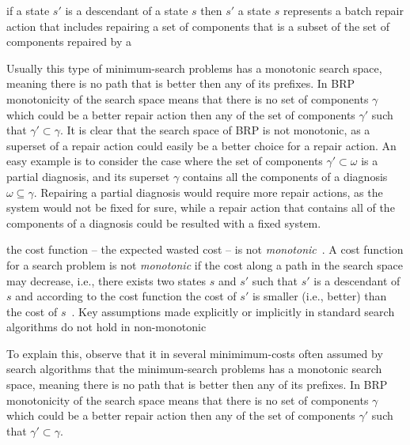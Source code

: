 if a state $s'$ is a descendant of a state $s$ 
then $s'$ 
a state $s$ represents a batch repair action that includes repairing a set of components that is
a subset of the set of components repaired by a 


Usually this type of minimum-search problems has a monotonic search space, meaning there is no path that is better then any of its prefixes. In BRP monotonicity of the search space means that there is no set of components $\gamma$ which could be a better repair action then any of the set of components $\gamma'$ such that ${\gamma}' \subset \gamma$. It is clear that the search space of BRP is not monotonic, as a superset of a repair action could easily be a better choice for a repair action. An easy example is to consider the case where the set of components $\gamma' \subset \omega$ is a partial diagnosis, and its superset $\gamma$ contains all the components of a diagnosis $\omega \subseteq \gamma$. Repairing a partial diagnosis would require more repair actions, as the system would not be fixed for sure, while a repair action that contains all of the components of a diagnosis could be resulted with a fixed system.



the cost function -- the expected wasted cost -- is not \emph{monotonic}~\cite{stern2014max}. 
A cost function for a search problem is not \emph{monotonic} if the cost along a path in the search space may decrease, 
i.e., there exists two states $s$ and $s'$ such that $s'$ is a descendant of $s$ 
and according to the cost function the cost of $s'$ is smaller (i.e., better) than the cost of $s$~\cite{stern2014max}. 
Key assumptions made explicitly or implicitly in standard search algorithms do not hold in non-monotonic


To explain this, observe that it in several minimimum-costs often assumed by search algorithms that the minimum-search problems has a monotonic search space, meaning there is no path that is better then any of its prefixes. In BRP monotonicity of the search space means that there is no set of components $\gamma$ which could be a better repair action then any of the set of components $\gamma'$ such that ${\gamma}' \subset \gamma$. 

